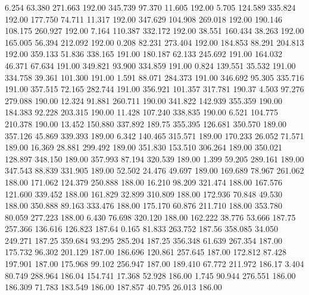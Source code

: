    6.254   63.380  271.663       192.00
 345.739   97.370   11.605       192.00
   5.705  124.589  335.824       192.00
 177.750   74.711   11.317       192.00
 347.629  104.908  269.018       192.00
 190.146  108.175  260.927       192.00
   7.164  110.387  332.172       192.00
  38.551  160.434   38.263       192.00
 165.005   56.394  212.092       192.00
   0.208   82.231  273.404       192.00
 184.853   88.291  204.813       192.00
 359.133   51.836  338.165       191.00
 180.187   62.133  245.692       191.00
 164.032   46.371   67.634       191.00
 349.821   93.900  334.859       191.00
   0.824  139.551   35.532       191.00
 334.758   39.361  101.300       191.00
   1.591   88.071  284.373       191.00
 346.692   95.305  335.716       191.00
 357.515   72.165  282.744       191.00
 356.921  101.357  317.781       190.37
   4.503   97.276  279.088       190.00
  12.324   91.881  260.711       190.00
 341.822  142.939  355.359       190.00
 184.383   92.228  203.315       190.00
  11.428  107.240  338.835       190.00
   6.521  104.775  210.378       190.00
  13.452  150.880  337.892       189.75
 355.395  126.681  350.570       189.00
 357.126   45.869  339.393       189.00
   6.342  140.465  315.571       189.00
 170.233   26.052   71.571       189.00
  16.369   28.881  299.492       189.00
 351.830  153.510  306.264       189.00
 350.021  128.897  348.150       189.00
 357.993   87.194  320.539       189.00
   1.399   59.205  289.161       189.00
 347.543   88.839  331.905       189.00
  52.502   24.476   49.697       189.00
 169.689   78.967  261.062       188.00
 171.062  124.379  250.888       188.00
  16.210   98.209  321.474       188.00
 167.576  121.600  339.452       188.00
 161.829   32.899  310.809       188.00
 172.936   70.848   49.530       188.00
 350.888   89.163  333.476       188.00
 175.170   60.876  211.710       188.00
 353.780   80.059  277.223       188.00
   6.430   76.698  320.120       188.00
 162.222   38.776   53.666       187.75
 257.366  136.616  126.823       187.64
   0.165   81.833  263.752       187.56
 358.085   34.050  249.271       187.25
 359.684   93.295  285.204       187.25
 356.348   61.639  267.354       187.00
 175.732   96.302  201.129       187.00
 186.696  120.861  257.645       187.00
 172.812   87.428  197.901       187.00
 175.968   99.102  256.947       187.00
 189.410   67.772  211.972       186.17
   3.404   80.749  288.964       186.04
 154.741   17.368   52.928       186.00
   1.745   90.944  276.551       186.00
 186.309   71.783  183.549       186.00
 187.857   40.795   26.013       186.00
